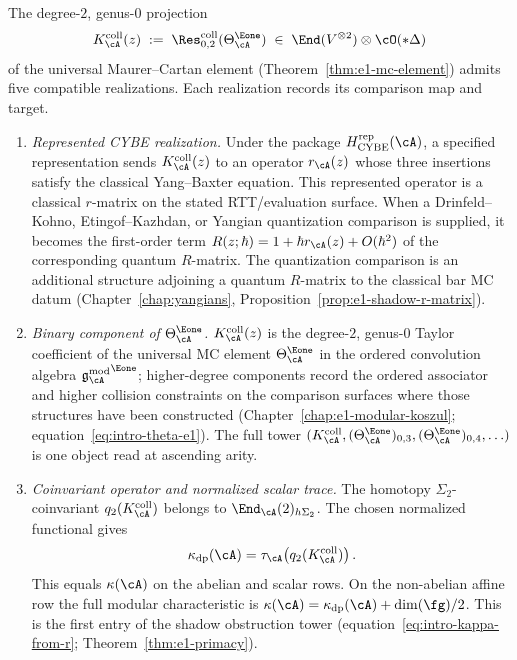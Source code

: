 \begin{proposition}
\label{prop:five-facets-collision-residue}
\ClaimStatusConditional
{}%
%
%
The degree-$2$, genus-$0$ projection
\[
K_\cA^{\mathrm{coll}}(z)
\;:=\;
\Res^{\mathrm{coll}}_{0,2}(\Theta_\cA^{\Eone})
\;\in\;
\End(V^{\otimes 2}) \otimes \cO(*\Delta)
\]
of the universal Maurer--Cartan element
\textup{(}Theorem~\textup{\ref{thm:e1-mc-element}}\textup{)}
admits five compatible realizations.  Each realization records its
comparison map and target.
\begin{enumerate}[label=\textup{(F\arabic*)}]
\item \emph{Represented CYBE realization.}
 Under the package $H_{\mathrm{CYBE}}^{\mathrm{rep}}(\cA)$, a
 specified representation sends $K_\cA^{\mathrm{coll}}(z)$ to an
 operator $r_\cA(z)$ whose three insertions satisfy the classical
 Yang--Baxter equation.  This represented operator is a classical
 $r$-matrix on the stated RTT/evaluation surface.
 When a Drinfeld--Kohno, Etingof--Kazhdan, or Yangian quantization
 comparison is supplied, it becomes the first-order term
 $R(z;\hbar)=1+\hbar r_\cA(z)+O(\hbar^2)$ of the corresponding quantum
 $R$-matrix. The quantization comparison is an additional structure
 adjoining a quantum $R$-matrix to the classical bar MC datum
 \textup{(}Chapter~\textup{\ref{chap:yangians}},
 Proposition~\textup{\ref{prop:e1-shadow-r-matrix}}\textup{)}.

\item \emph{Binary component of $\Theta_\cA^{\Eone}$.}
 $K_\cA^{\mathrm{coll}}(z)$ is the degree-$2$, genus-$0$ Taylor
 coefficient of the
 universal MC element $\Theta_\cA^{\Eone}$ in the ordered
 convolution algebra ${\gAmod}^{\Eone}$; higher-degree components
 record the ordered associator and higher collision constraints on the
 comparison surfaces where those structures have been constructed
 \textup{(}Chapter~\textup{\ref{chap:e1-modular-koszul}};
 equation~\textup{\eqref{eq:intro-theta-e1}}\textup{)}. The full tower
 $(K_\cA^{\mathrm{coll}},(\Theta_\cA^{\Eone})_{0,3},
 (\Theta_\cA^{\Eone})_{0,4},\ldots)$ is one object read at ascending
 arity.

\item \emph{Coinvariant operator and normalized scalar trace.}
 The homotopy $\Sigma_2$-coinvariant
 $q_2(K_\cA^{\mathrm{coll}})$ belongs to
 $\End_\cA(2)_{h\Sigma_2}$.  The chosen normalized functional gives
 \[
  \kappa_{\mathrm{dp}}(\cA)
  =\tau_\cA\!\left(q_2(K_\cA^{\mathrm{coll}})\right).
 \]
 This equals $\kappa(\cA)$ on the abelian and scalar rows.  On the
 non-abelian affine row the full modular characteristic is
 $\kappa(\cA)=\kappa_{\mathrm{dp}}(\cA)+\dim(\fg)/2$.  This is
 the first entry of the shadow obstruction tower
 \textup{(}equation~\textup{\eqref{eq:intro-kappa-from-r}};
 Theorem~\textup{\ref{thm:e1-primacy}}\textup{)}.


\end{enumerate}
\end{proposition}
